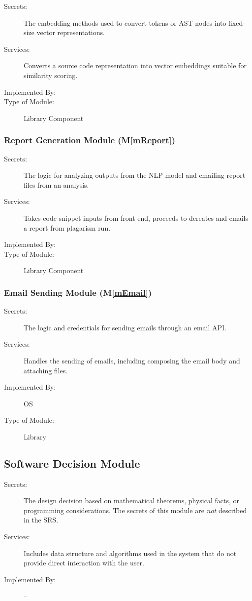 \documentclass[12pt, titlepage]{article}
\newcommand{\mref}[1]{M\ref{#1}}
\begin{document}
\begin{description}
\item[Secrets:] The embedding methods used to convert tokens or AST nodes into fixed-size vector representations.
\item[Services:] Converts a source code representation into vector embeddings suitable for similarity scoring.
\item[Implemented By:] \progname{}
\item[Type of Module:] Library Component
\end{description}

\subsubsection{Report Generation Module (\mref{mReport})}

\begin{description}
\item[Secrets:] The logic for analyzing outputs from the NLP model and emailing 
report files from an analysis.
\item[Services:] Takes code snippet inputs from front end, proceeds to dcreates and emails a report from plagarism run.
\item[Implemented By:] \progname{}
\item[Type of Module:] Library Component
\end{description}

\subsubsection{Email Sending Module (\mref{mEmail})}

\begin{description}
\item[Secrets:] The logic and credentials for sending emails through an email API.
\item[Services:] Handles the sending of emails, including composing the email body and attaching files.
\item[Implemented By:] OS
\item[Type of Module:] Library
\end{description}

\subsection{Software Decision Module}

\begin{description}
\item[Secrets:] The design decision based on mathematical theorems, physical
  facts, or programming considerations. The secrets of this module are
  \emph{not} described in the SRS.
\item[Services:] Includes data structure and algorithms used in the system that
  do not provide direct interaction with the user. 
\item[Implemented By:] --
\end{description}
\end{document}
